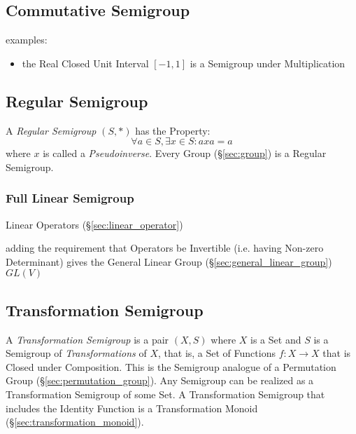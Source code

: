 \subsection{Commutative Semigroup}\label{sec:commutative_semigroup}

examples:
\begin{itemize}
  \item the Real Closed Unit Interval $[-1,1]$ is a Semigroup under
    Multiplication
\end{itemize}



\subsection{Regular Semigroup}\label{sec:regular_semigroup}

A \emph{Regular Semigroup} $(S,*)$ has the Property:
\[
  \forall a \in S, \exists x \in S : axa = a
\]
where $x$ is called a \emph{Pseudoinverse}. Every Group
(\S\ref{sec:group}) is a Regular Semigroup.



\subsubsection{Full Linear Semigroup}\label{sec:full_linear_semigroup}

Linear Operators (\S\ref{sec:linear_operator})

adding the requirement that Operators be Invertible (i.e. having Non-zero
Determinant) gives the General Linear Group (\S\ref{sec:general_linear_group})
$GL(V)$



\subsection{Transformation Semigroup}\label{sec:transformation_semigroup}

A \emph{Transformation Semigroup} is a pair $(X,S)$ where $X$ is a Set
and $S$ is a Semigroup of \emph{Transformations} of $X$, that is, a
Set of Functions $f : X \rightarrow X$ that is Closed under
Composition. This is the Semigroup analogue of a Permutation Group
(\S\ref{sec:permutation_group}). Any Semigroup can be realized as a
Transformation Semigroup of some Set. A Transformation Semigroup that
includes the Identity Function is a Transformation Monoid
(\S\ref{sec:transformation_monoid}).

